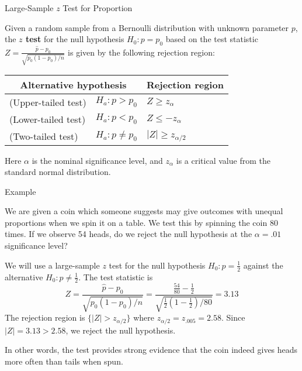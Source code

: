 \documentclass{beamer}
\renewcommand{\emph}{\textbf}
\begin{document}
\begin{frame}{Large-Sample $z$ Test for Proportion}
\begin{block}{}
Given a random sample from a Bernoulli distribution with unknown parameter $p$, the \emph{$z$ test} for the null hypothesis $H_0: p=p_0$ based on the test statistic $Z=\frac{\hat p-p_0}{\sqrt{p_0(1-p_0)/n}}$ is given by the following rejection region:
\begin{center}
\begin{tabular}{ll|l}
\multicolumn{2}{c}{Alternative hypothesis} & Rejection region \\ \hline
(Upper-tailed test) & $H_a: p>p_0$ & $Z\geq z_{\alpha}$ \\
(Lower-tailed test) & $H_a: p<p_0$ & $Z\leq -z_{\alpha}$ \\
(Two-tailed test) & $H_a: p\neq p_0$ & $|Z|\geq z_{\alpha/2}$\\
\end{tabular}
\end{center}
Here $\alpha$ is the nominal significance level, and $z_{\alpha}$ is a critical value from the standard normal distribution.
\end{block}
\end{frame}

\begin{frame}{Example}
\begin{block}{}
We are given a coin which someone suggests may give outcomes with unequal proportions when we spin it on a table. We test this by spinning the coin 80 times. If we observe 54 heads, do we reject the null hypothesis at the $\alpha=.01$ significance level?
\end{block}
\pause We will use a large-sample $z$ test for the null hypothesis $H_0: p=\frac12$ against the alternative $H_0: p\neq\frac12$. \pause The test statistic is
$$Z=\frac{\hat p-p_0}{\sqrt{p_0(1-p_0)/n}}=\frac{\frac{54}{80}-\frac12}{\sqrt{\frac12(1-\frac12)/80}}=3.13$$
\pause The rejection region is $\{|Z|>z_{\alpha/2}\}$ where $z_{\alpha/2}=z_{.005}=2.58$. \pause Since $|Z|=3.13>2.58$, we reject the null hypothesis. 

\vspace{.2cm}
\pause In other words, the test provides strong evidence that the coin indeed gives heads more often than tails when spun.
\end{frame}
\end{document}
